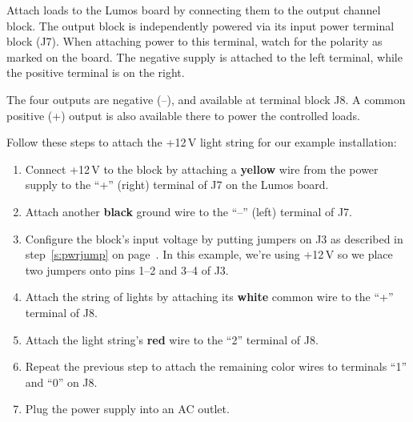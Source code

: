 \documentclass[letterpaper,twoside,onecolumn,openright,final]{memoir}
\begin{document}
Attach loads to the Lumos board by connecting them to the output channel block. 
The output block is independently powered via its input power terminal block (J7).
When attaching power to this terminal, watch for the polarity as marked on the board.  The negative supply
is attached to the left terminal, while the positive terminal is on the right.

The four outputs are negative (--), and available at terminal block J8.
A common positive (+) output is also available there to power the controlled loads.

Follow these steps to attach the +12\,V light string for our example installation:

\begin{enumerate}
	\item 	Connect +12\,V to the block by attaching a {\bfseries yellow} wire from the power supply to
		the ``+'' (right) terminal of J7 on the Lumos board.

	\item	Attach another {\bfseries black} ground wire to the ``--'' (left) terminal of J7.

	\item	Configure the block's input voltage by putting jumpers on J3 as described in 
		step~\ref{s:pwrjump} on page~\pageref{s:pwrjump}.  In this example, we're using +12\,V so we place
		two jumpers onto pins 1--2 and 3--4 of J3.

	\item\label{s:led1}
		Attach the string of  lights by attaching its {\bfseries white} common wire to the ``+''
		terminal of J8.

	\item	Attach the light string's {\bfseries red} wire to the ``2'' terminal of J8.

	\item\label{s:led2}
		Repeat the previous step to attach the remaining color wires to terminals ``1'' and ``0'' on J8.

	\item	Plug the power supply into an AC outlet.
\end{enumerate}
\end{document}
